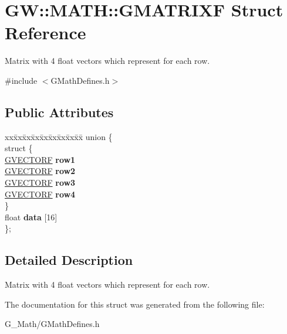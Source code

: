 \hypertarget{struct_g_w_1_1_m_a_t_h_1_1_g_m_a_t_r_i_x_f}{}\section{GW\+:\+:M\+A\+TH\+:\+:G\+M\+A\+T\+R\+I\+XF Struct Reference}
\label{struct_g_w_1_1_m_a_t_h_1_1_g_m_a_t_r_i_x_f}


Matrix with 4 float vectors which represent for each row.  




{\ttfamily \#include $<$G\+Math\+Defines.\+h$>$}

\subsection*{Public Attributes}
\begin{DoxyCompactItemize}
\item 
\mbox{\label{struct_g_w_1_1_m_a_t_h_1_1_g_m_a_t_r_i_x_f_a11be480da796165318d456b16f72d5e1}} 
\begin{tabbing}
xx\=xx\=xx\=xx\=xx\=xx\=xx\=xx\=xx\=\kill
union \{\\
\mbox{\label{union_g_w_1_1_m_a_t_h_1_1_g_m_a_t_r_i_x_f_1_1_0D12_a9d73f51400dc55a0d7b56e032f731459}} 
\>struct \{\\
\>\>\mbox{\hyperlink{struct_g_w_1_1_m_a_t_h_1_1_g_v_e_c_t_o_r_f}{GVECTORF}} {\bfseries row1}\\
\>\>\mbox{\hyperlink{struct_g_w_1_1_m_a_t_h_1_1_g_v_e_c_t_o_r_f}{GVECTORF}} {\bfseries row2}\\
\>\>\mbox{\hyperlink{struct_g_w_1_1_m_a_t_h_1_1_g_v_e_c_t_o_r_f}{GVECTORF}} {\bfseries row3}\\
\>\>\mbox{\hyperlink{struct_g_w_1_1_m_a_t_h_1_1_g_v_e_c_t_o_r_f}{GVECTORF}} {\bfseries row4}\\
\>\} \\
\>float {\bfseries data} \mbox{[}16\mbox{]}\\
\}; \\

\end{tabbing}\end{DoxyCompactItemize}


\subsection{Detailed Description}
Matrix with 4 float vectors which represent for each row. 

The documentation for this struct was generated from the following file\+:\begin{DoxyCompactItemize}
\item 
G\+\_\+\+Math/G\+Math\+Defines.\+h\end{DoxyCompactItemize}
